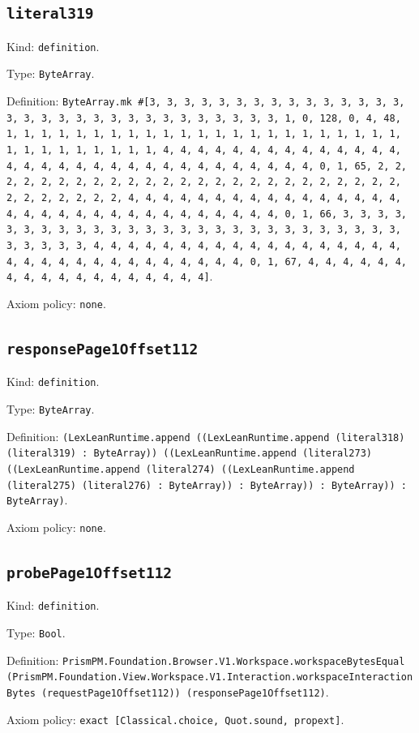 \documentclass[11pt]{article}
\begin{document}
\subsection*{\texttt{literal319}}
\noindent Kind: \texttt{definition}.\par
\noindent Type: \texttt{ByteArray}.\par
\noindent Definition: \texttt{ByteArray.mk \#[3, 3, 3, 3, 3, 3, 3, 3, 3, 3, 3, 3, 3, 3, 3, 3, 3, 3, 3, 3, 3, 3, 3, 3, 3, 3, 3, 3, 3, 3, 3, 1, 0, 128, 0, 4, 48, 1, 1, 1, 1, 1, 1, 1, 1, 1, 1, 1, 1, 1, 1, 1, 1, 1, 1, 1, 1, 1, 1, 1, 1, 1, 1, 1, 1, 1, 1, 1, 1, 4, 4, 4, 4, 4, 4, 4, 4, 4, 4, 4, 4, 4, 4, 4, 4, 4, 4, 4, 4, 4, 4, 4, 4, 4, 4, 4, 4, 4, 4, 4, 4, 0, 1, 65, 2, 2, 2, 2, 2, 2, 2, 2, 2, 2, 2, 2, 2, 2, 2, 2, 2, 2, 2, 2, 2, 2, 2, 2, 2, 2, 2, 2, 2, 2, 2, 2, 4, 4, 4, 4, 4, 4, 4, 4, 4, 4, 4, 4, 4, 4, 4, 4, 4, 4, 4, 4, 4, 4, 4, 4, 4, 4, 4, 4, 4, 4, 4, 4, 0, 1, 66, 3, 3, 3, 3, 3, 3, 3, 3, 3, 3, 3, 3, 3, 3, 3, 3, 3, 3, 3, 3, 3, 3, 3, 3, 3, 3, 3, 3, 3, 3, 3, 3, 4, 4, 4, 4, 4, 4, 4, 4, 4, 4, 4, 4, 4, 4, 4, 4, 4, 4, 4, 4, 4, 4, 4, 4, 4, 4, 4, 4, 4, 4, 4, 4, 0, 1, 67, 4, 4, 4, 4, 4, 4, 4, 4, 4, 4, 4, 4, 4, 4, 4, 4, 4, 4]}.\par
\noindent Axiom policy: \texttt{none}.\par
\subsection*{\texttt{responsePage1Offset112}}
\noindent Kind: \texttt{definition}.\par
\noindent Type: \texttt{ByteArray}.\par
\noindent Definition: \texttt{(LexLeanRuntime.append ((LexLeanRuntime.append (literal318) (literal319) : ByteArray)) ((LexLeanRuntime.append (literal273) ((LexLeanRuntime.append (literal274) ((LexLeanRuntime.append (literal275) (literal276) : ByteArray)) : ByteArray)) : ByteArray)) : ByteArray)}.\par
\noindent Axiom policy: \texttt{none}.\par
\subsection*{\texttt{probePage1Offset112}}
\noindent Kind: \texttt{definition}.\par
\noindent Type: \texttt{Bool}.\par
\noindent Definition: \texttt{PrismPM.Foundation.Browser.V1.Workspace.workspaceBytesEqual (PrismPM.Foundation.View.Workspace.V1.Interaction.workspaceInteractionBytes (requestPage1Offset112)) (responsePage1Offset112)}.\par
\noindent Axiom policy: \texttt{exact [Classical.choice, Quot.sound, propext]}.\par
\end{document}

